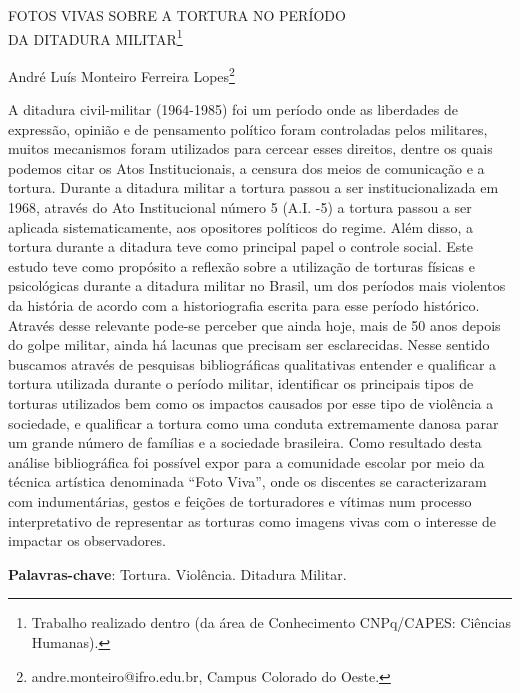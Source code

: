 \documentclass[article,12pt,onesidea,4paper,english,brazil]{abntex2}
\begin{document}
	
	
	\frenchspacing 
	
	\begin{center}
		\LARGE FOTOS VIVAS SOBRE A TORTURA NO PERÍODO\\DA DITADURA MILITAR\footnote{Trabalho realizado dentro (da área de Conhecimento CNPq/CAPES: Ciências Humanas).}
		
		\normalsize
		André Luís Monteiro Ferreira Lopes\footnote{andre.monteiro@ifro.edu.br, Campus Colorado do Oeste.} 
	\end{center}
	
	\noindent A ditadura civil-militar (1964-1985) foi um período onde as liberdades de expressão, opinião e de pensamento político foram controladas pelos militares, muitos mecanismos foram utilizados para cercear esses direitos, dentre os quais podemos citar os Atos Institucionais, a censura dos meios de comunicação e a tortura. Durante a ditadura militar a tortura passou a ser institucionalizada em 1968, através do Ato Institucional número 5 (A.I. -5) a tortura passou a ser aplicada sistematicamente, aos opositores políticos do regime. Além disso, a tortura durante a ditadura teve como principal papel o controle social. Este estudo teve como propósito a reflexão sobre a utilização de torturas físicas e psicológicas durante a ditadura militar no Brasil, um dos períodos mais violentos da história de acordo com a historiografia escrita para esse período histórico. Através desse relevante pode-se perceber que ainda hoje, mais de 50 anos depois do golpe militar, ainda há lacunas que precisam ser esclarecidas. Nesse sentido buscamos através de pesquisas bibliográficas qualitativas entender e qualificar a tortura utilizada durante o período militar, identificar os principais tipos de torturas utilizados bem como os impactos causados por esse tipo de violência a sociedade, e qualificar a tortura como uma conduta extremamente danosa parar um grande número de famílias e a sociedade brasileira. Como resultado desta análise bibliográfica foi possível expor para a comunidade escolar por meio da técnica artística denominada “Foto Viva”, onde os discentes se caracterizaram com indumentárias, gestos e feições de torturadores e vítimas num processo interpretativo de representar as torturas como imagens vivas com o interesse de impactar os observadores.
	\vspace{\onelineskip}
	
	\noindent
	\textbf{Palavras-chave}: Tortura. Violência. Ditadura Militar.
	
\end{document}

